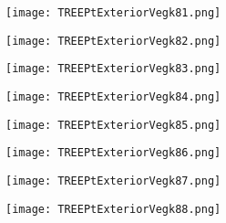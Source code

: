 \documentclass[pdf]{beamer}
\begin{document}
\begin{frame}
\begin{figure}[!h]
\centering
\texttt{[image: TREEPtExteriorVegk81.png]}
\end{figure}
\end{frame}

\begin{frame}
\begin{figure}[!h]
\centering
\texttt{[image: TREEPtExteriorVegk82.png]}
\end{figure}
\end{frame}

\begin{frame}
\begin{figure}[!h]
\centering
\texttt{[image: TREEPtExteriorVegk83.png]}
\end{figure}
\end{frame}

\begin{frame}
\begin{figure}[!h]
\centering
\texttt{[image: TREEPtExteriorVegk84.png]}
\end{figure}
\end{frame}

\begin{frame}
\begin{figure}[!h]
\centering
\texttt{[image: TREEPtExteriorVegk85.png]}
\end{figure}
\end{frame}

\begin{frame}
\begin{figure}[!h]
\centering
\texttt{[image: TREEPtExteriorVegk86.png]}
\end{figure}
\end{frame}

\begin{frame}
\begin{figure}[!h]
\centering
\texttt{[image: TREEPtExteriorVegk87.png]}
\end{figure}
\end{frame}

\begin{frame}
\begin{figure}[!h]
\centering
\texttt{[image: TREEPtExteriorVegk88.png]}
\end{figure}
\end{frame}
\end{document}
